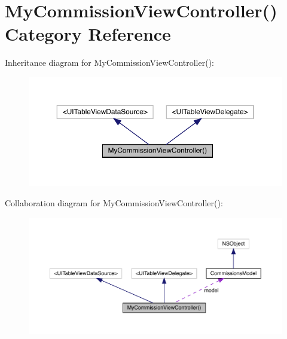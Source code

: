 \hypertarget{category_my_commission_view_controller_07_08}{}\section{My\+Commission\+View\+Controller() Category Reference}
\label{category_my_commission_view_controller_07_08}


Inheritance diagram for My\+Commission\+View\+Controller()\+:\nopagebreak
\begin{figure}[H]
\begin{center}
\leavevmode
\includegraphics[width=350pt]{category_my_commission_view_controller_07_08__inherit__graph}
\end{center}
\end{figure}


Collaboration diagram for My\+Commission\+View\+Controller()\+:\nopagebreak
\begin{figure}[H]
\begin{center}
\leavevmode
\includegraphics[width=350pt]{category_my_commission_view_controller_07_08__coll__graph}
\end{center}
\end{figure}
